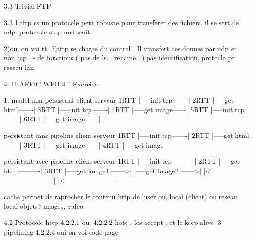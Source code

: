 3.3 Trivial FTP

3.3.1 
tftp es un protocole peut robuste pour transferer des fichiers. il se sert de udp. 
protocole stop and wait 

2)oui on voi tt.
3)tftp se charge du control . Il transfert ces donnes par udp et non tcp . - de fonctions ( pas de ls... rename...) pas identification, protocle pr reseau lan


4 TRAFFIC WEB 
4.1 Exercice 

 1.
 model non persistant
  		client 				serveur 
 	1RTT	|-----init tcp-------|
 	2RTT	|-----get html-------|
 	3RTT	|-----init tcp-------|
 	4RTT	|-----get image------|
 	5RTT	|-----init tcp-------|
 	6RTT	|-----get image------|	
 	
 	persistant sans pipeline
 			client 				serveur 
 	1RTT	|-----init tcp-------|
 	2RTT	|-----get html-------|
 	3RTT	|-----get image------|
 	4RTT	|-----get image------|	
 	
 		persistant avec pipeline
 		client 				serveur 
 	1RTT	|-----init tcp----------|
 	2RTT	|-----get html----------|
 	3RTT	|-----get image1 ------>|
 			|-----get image2 ------>|	
 	 	    |<----------------------|
 	 	    |<----------------------|
 	 	
 	 	cache permet de raprocher le contenu http de luser
 	 	ou, local (client) ou reseau local
 	 	objets? images, video    
 	
4.2 Protocole http
4.2.2.1 oui
4.2.2.2 hote , les accept , et le keep alive 
.3 pipelining 
4.2.2.4 oui  on  voi code page 





